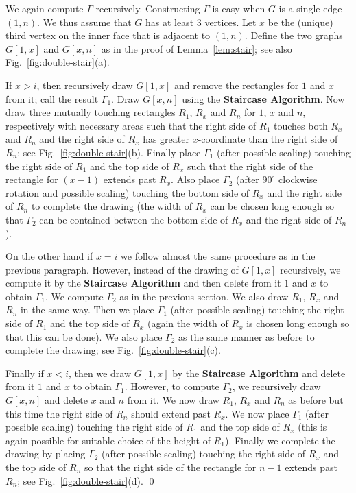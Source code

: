 \documentclass{llncs}
\renewenvironment{proof}{\medskip\noindent{\bf Proof:}}{\mbox{}\hfill\qed\par}
\begin{document}
\begin{proof}
We again compute $\Gamma$ recursively. Constructing $\Gamma$ is easy when $G$ is a single
 edge $(1,n)$. We thus assume that $G$ has at least 3 vertices. Let $x$ be the (unique)
 third vertex on the inner face that is adjacent to $(1,n)$. Define the two graphs $G[1,x]$
 and $G[x,n]$ as in the proof of Lemma~\ref{lem:stair}; see also Fig.~\ref{fig:double-stair}(a).






If $x>i$, then recursively draw $G[1,x]$ and remove the rectangles for $1$ and $x$ from it;
 call the result $\Gamma_1$. Draw $G[x,n]$ using the \textbf{Staircase Algorithm}. Now draw
 three mutually touching rectangles $R_1$, $R_x$ and $R_n$ for $1$, $x$ and $n$, respectively
 with necessary areas such that the right side of $R_1$ touches both $R_x$ and $R_n$ and
 the right side of $R_x$ has greater $x$-coordinate than the right side of $R_n$; see
 Fig.~\ref{fig:double-stair}(b). Finally place $\Gamma_1$ (after possible scaling) touching
 the right side of $R_1$ and the top side of $R_x$ such that the right side of the rectangle
 for $(x-1)$ extends past $R_x$. Also place $\Gamma_2$ (after $90^{\circ}$ clockwise rotation
 and possible scaling) touching the bottom side of $R_x$ and the right side of $R_n$ to
 complete the drawing (the width of $R_x$ can be chosen long enough so that $\Gamma_2$
 can be contained between the bottom side of $R_x$ and the right side of $R_n$).
	



	
 On the other hand if $x=i$ we follow almost the same procedure as in the previous paragraph.
	However, instead of the drawing of $G[1,x]$ recursively, we compute it by the \textbf{Staircase
	Algorithm} and then delete from it $1$ and $x$ to obtain $\Gamma_1$. We compute $\Gamma_2$
	as in the previous section. We also draw $R_1$, $R_x$ and $R_n$ in the same way. Then we
	place $\Gamma_1$ (after possible scaling) touching the right side of $R_1$ and the top
	side of $R_x$ (again the width of $R_x$ is chosen long enough so that this can be done).
	We also place $\Gamma_2$ as the same manner as before to complete the drawing; see
	Fig.~\ref{fig:double-stair}(c).
	
	
	Finally if $x<i$, then we draw $G[1,x]$ by the \textbf{Staircase Algorithm} and delete
	from it $1$ and $x$ to obtain $\Gamma_1$. However, to compute $\Gamma_2$, we recursively
	draw $G[x,n]$ and delete $x$ and $n$ from it. We now draw $R_1$, $R_x$ and $R_n$ as
	before but this time the right side of $R_n$ should extend past $R_x$. We now place
	$\Gamma_1$ (after possible scaling) touching the right side of $R_1$ and the top side
	of $R_x$ (this is again possible for suitable choice of the height of $R_1$). Finally
	we complete the drawing by placing $\Gamma_2$ (after possible scaling) touching the
	right side of $R_x$ and the top side of $R_n$ so that the right side of the rectangle
	for $n-1$ extends past $R_n$; see Fig.~\ref{fig:double-stair}(d).
\end{proof}
\end{document}
